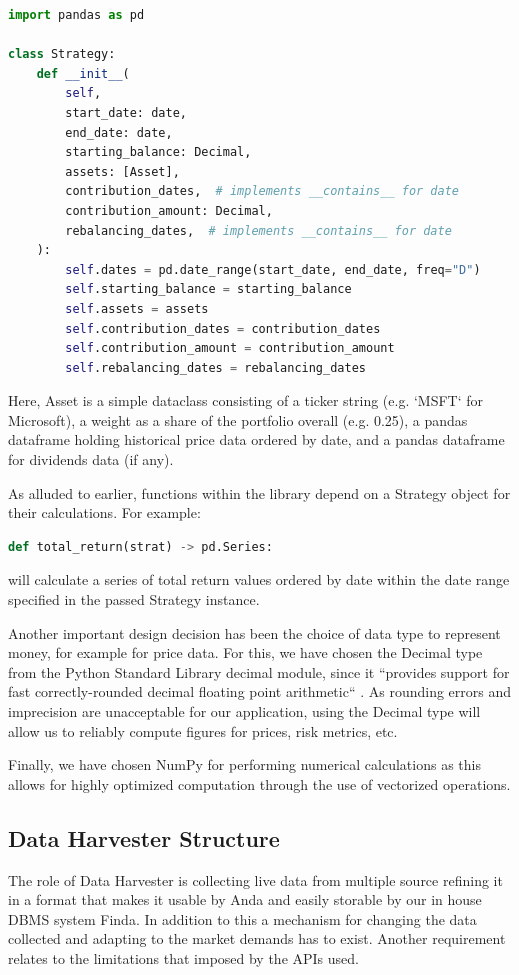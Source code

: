 \documentclass[main.tex]{subfiles}
\begin{document}
\begin{lstlisting}[language=Python, caption=setup.py - Development environment, label=lst:Development_env]
import pandas as pd

class Strategy:
    def __init__(
        self,
        start_date: date,
        end_date: date,
        starting_balance: Decimal,
        assets: [Asset],
        contribution_dates,  # implements __contains__ for date
        contribution_amount: Decimal,
        rebalancing_dates,  # implements __contains__ for date
    ):
        self.dates = pd.date_range(start_date, end_date, freq="D")
        self.starting_balance = starting_balance
        self.assets = assets
        self.contribution_dates = contribution_dates
        self.contribution_amount = contribution_amount
        self.rebalancing_dates = rebalancing_dates
\end{lstlisting}

Here, Asset is a simple dataclass consisting of a ticker string (e.g. `MSFT` for Microsoft), a weight as a share of the portfolio overall (e.g. 0.25), a pandas dataframe holding historical price data ordered by date, and a pandas dataframe for dividends data (if any).

As alluded to earlier, functions within the library depend on a Strategy object for their calculations. For example:

\begin{lstlisting}[language=Python, caption=setup.py - Development environment, label=lst:Development_env]
def total_return(strat) -> pd.Series:
\end{lstlisting}
will calculate a series of total return values ordered by date within the date range specified in the passed Strategy instance.

Another important design decision has been the choice of data type to represent money, for example for price data. For this, we have chosen the Decimal type from the Python Standard Library decimal module, since it ``provides support for fast correctly-rounded decimal floating point arithmetic`` \cite{PyDecimal}. As rounding errors and imprecision are unacceptable for our application, using the Decimal type will allow us to reliably compute figures for prices, risk metrics, etc.

Finally, we have chosen NumPy \cite{walt2011numpy} for performing numerical calculations as this allows for highly optimized computation through the use of vectorized operations.

\subsection{Data Harvester Structure}
The role of Data Harvester is collecting live data from multiple source  refining it in a format that makes it usable by Anda and easily storable  by our in house DBMS system Finda. In addition to this a mechanism for changing the data collected and adapting to the market demands has to exist. Another requirement relates to the limitations that imposed by the APIs used. 
\end{document}
